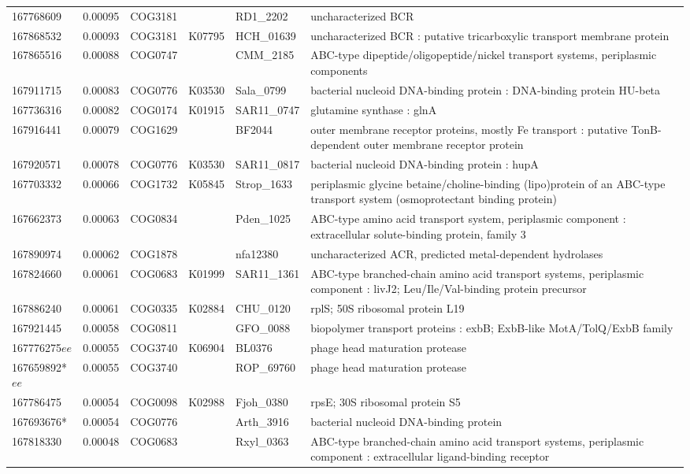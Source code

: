 \begin{landscape}
\begin{longtable}{p{1.6cm}p{1.2cm}p{1.5cm}p{1.5cm}p{2.8cm}p{13.5cm}}
167768609&0.00095&COG3181&&RD1\_2202&uncharacterized BCR \\
167868532&0.00093&COG3181&K07795&HCH\_01639&uncharacterized BCR : putative tricarboxylic transport membrane protein \\
167865516&0.00088&COG0747&&CMM\_2185&ABC-type dipeptide/oligopeptide/nickel transport systems, periplasmic components \\
167911715&0.00083&COG0776&K03530&Sala\_0799&bacterial nucleoid DNA-binding protein : DNA-binding protein HU-beta \\
167736316&0.00082&COG0174&K01915&SAR11\_0747&glutamine synthase : glnA \\
167916441&0.00079&COG1629&&BF2044&outer membrane receptor proteins, mostly Fe transport : putative TonB-dependent outer membrane receptor protein \\
167920571&0.00078&COG0776&K03530&SAR11\_0817&bacterial nucleoid DNA-binding protein : hupA \\
167703332&0.00066&COG1732&K05845&Strop\_1633&periplasmic glycine betaine/choline-binding (lipo)protein of an ABC-type transport system (osmoprotectant binding protein) \\
167662373&0.00063&COG0834&&Pden\_1025&ABC-type amino acid transport system, periplasmic component : extracellular solute-binding protein, family 3 \\
167890974&0.00062&COG1878&&nfa12380&uncharacterized ACR, predicted metal-dependent hydrolases \\
167824660&0.00061&COG0683&K01999&SAR11\_1361&ABC-type branched-chain amino acid transport systems, periplasmic component : livJ2; Leu/Ile/Val-binding protein precursor \\
167886240&0.00061&COG0335&K02884&CHU\_0120&rplS; 50S ribosomal protein L19 \\
167921445&0.00058&COG0811&&GFO\_0088&biopolymer transport proteins : exbB; ExbB-like MotA/TolQ/ExbB family \\
167776275$ee$&0.00055&COG3740&K06904&BL0376&phage head maturation protease \\
167659892*$ee$&0.00055&COG3740&&ROP\_69760&phage head maturation protease \\
167786475&0.00054&COG0098&K02988&Fjoh\_0380&rpsE; 30S ribosomal protein S5 \\
167693676*&0.00054&COG0776&&Arth\_3916&bacterial nucleoid DNA-binding protein \\
167818330&0.00048&COG0683&&Rxyl\_0363&ABC-type branched-chain amino acid transport systems, periplasmic component : extracellular ligand-binding receptor \\

\end{longtable}
\end{landscape}
